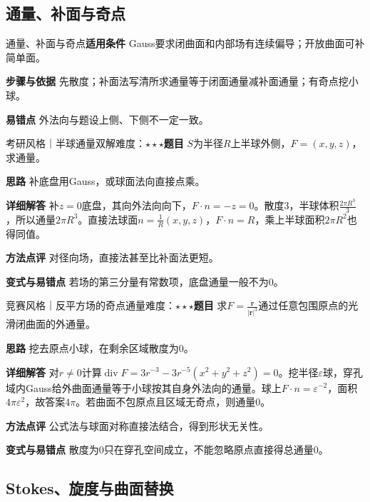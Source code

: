 \subsection{通量、补面与奇点}\label{deep:fields_source_deep:gauss}

\begin{method}{通量、补面与奇点}\textbf{适用条件} Gauss要求闭曲面和内部场有连续偏导；开放曲面可补简单面。\par\textbf{步骤与依据} 先散度；补面法写清所求通量等于闭面通量减补面通量；有奇点挖小球。\par\textbf{易错点} 外法向与题设上侧、下侧不一定一致。\end{method}

\begin{example}{考研风格｜半球通量双解}{难度：$\star\star\star$}\label{deep:ex:fields_source_deep:hemisphere}\textbf{题目} $S$为半径$R$上半球外侧，$F=(x,y,z)$，求通量。\par\textbf{思路} 补底盘用Gauss，或球面法向直接点乘。\par\textbf{详细解答} 补$z=0$底盘，其向外法向向下，$F\cdot n=-z=0$。散度3，半球体积$\frac{2\pi R^3}{3}$，所以通量$2\pi R^3$。直接法球面$n=\frac{1}{R}(x,y,z)$，$F\cdot n=R$，乘上半球面积$2\pi R^2$也得同值。\par\textbf{方法点评} 对径向场，直接法甚至比补面法更短。\par\textbf{变式与易错点} 若场的第三分量有常数项，底盘通量一般不为0。\end{example}

\begin{example}{竞赛风格｜反平方场的奇点通量}{难度：$\star\star\star$}\label{deep:ex:fields_source_deep:inverse}\textbf{题目} 求$F=\frac{\bm r}{|\bm r|^3}$通过任意包围原点的光滑闭曲面的外通量。\par\textbf{思路} 挖去原点小球，在剩余区域散度为0。\par\textbf{详细解答} 对$r\ne0$计算$\operatorname{div}F=3r^{-3}-3r^{-5}(x^2+y^2+z^2)=0$。挖半径$\varepsilon$球，穿孔域内Gauss给外曲面通量等于小球按其自身外法向的通量。球上$F\cdot n=\varepsilon^{-2}$，面积$4\pi\varepsilon^2$，故答案$4\pi$。若曲面不包原点且区域无奇点，则通量0。\par\textbf{方法点评} 公式法与球面对称直接法结合，得到形状无关性。\par\textbf{变式与易错点} 散度为0只在穿孔空间成立，不能忽略原点直接得总通量0。\end{example}

\subsection{Stokes、旋度与曲面替换}\label{deep:fields_source_deep:stokes}

